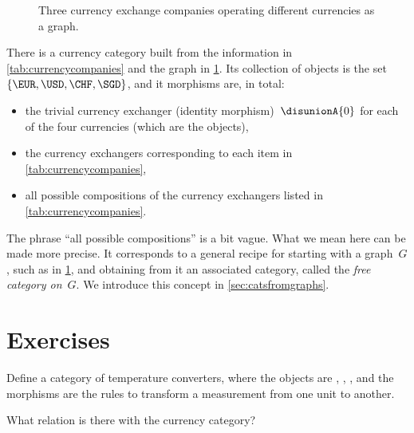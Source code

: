\begin{figure}[h]
  \begin{center}
  \end{center}
  \caption{Three currency exchange companies operating different currencies as a graph. }
  \label{fig:currencygraph}
\end{figure}

There is a currency category built from the information in \cref{tab:currencycompanies} and the graph in \cref{fig:currencygraph}. Its collection of objects is the set $\{  \EUR, \USD, \CHF, \SGD \}$, and it morphisms are, in total:
\begin{itemize}
  \item the trivial currency exchanger (identity morphism)~$\disunionA{0}$ for each of the four currencies (which are the objects),
  \item the currency exchangers corresponding to each item in \cref{tab:currencycompanies},
  \item all possible compositions of the currency exchangers listed in \cref{tab:currencycompanies}.
\end{itemize}

The phrase ``all possible compositions'' is a bit vague. What we mean here can be made more precise. It corresponds to a general recipe for starting with a graph~$G$, such as in \cref{fig:currencygraph}, and obtaining from it an associated category, called the \emph{free category on}~$G$. We introduce this concept in \cref{sec:catsfromgraphs}.

\section{Exercises}
\begin{exercise}[Temperatures]\label{ex:temperatures}
  Define a category of temperature converters, where the objects are
  , , , and the
  morphisms are the rules to transform a measurement from one unit to another.

  What relation is there with the currency category?

\end{exercise}
\begin{solution}
\end{solution}


